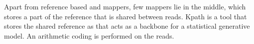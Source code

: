 Apart from reference based and \denovo mappers, few mappers lie in the middle, which  stores a part of the reference that is shared between reads. Kpath \citep{Kingsford2015} is a tool that stores the shared reference as that acts as a backbone for a statistical generative model. An arithmetic coding is performed on the reads.


